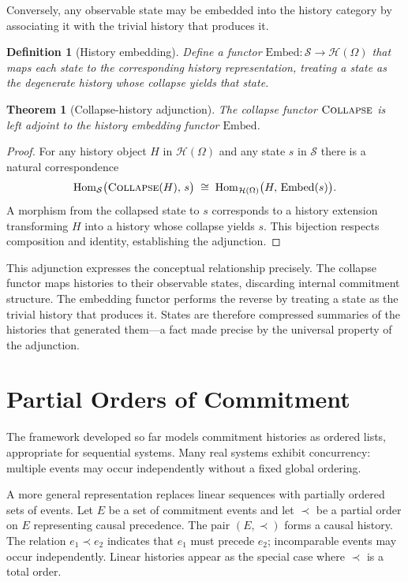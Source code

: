 \documentclass[12pt]{article}
\newtheorem{definition}{Definition}[section]
\newtheorem{theorem}{Theorem}[section]
\newcommand{\Collapse}{\operatorname{\textsc{Collapse}}}
\newcommand{\History}{\mathcal{H}}
\newcommand{\Option}{\Omega}
\newcommand{\State}{\mathcal{S}}
\begin{document}
Conversely, any observable state may be embedded into the history category by associating it with the trivial history that produces it.

\begin{definition}[History embedding]
Define a functor $\mathrm{Embed} : \State \to \History(\Option)$ that maps each state to the corresponding history representation, treating a state as the degenerate history whose collapse yields that state.
\end{definition}

\begin{theorem}[Collapse-history adjunction]
The collapse functor $\Collapse$ is left adjoint to the history embedding functor $\mathrm{Embed}$.
\end{theorem}

\begin{proof}
For any history object $H$ in $\History(\Option)$ and any state $s$ in $\State$ there is a natural correspondence
\[
\mathrm{Hom}_{\State}\bigl(\Collapse(H),\, s\bigr)
\;\cong\;
\mathrm{Hom}_{\History(\Option)}\bigl(H,\, \mathrm{Embed}(s)\bigr).
\]
A morphism from the collapsed state to $s$ corresponds to a history extension transforming $H$ into a history whose collapse yields $s$. This bijection respects composition and identity, establishing the adjunction.
\end{proof}

This adjunction expresses the conceptual relationship precisely. The collapse functor maps histories to their observable states, discarding internal commitment structure. The embedding functor performs the reverse by treating a state as the trivial history that produces it. States are therefore compressed summaries of the histories that generated them---a fact made precise by the universal property of the adjunction.

\section{Partial Orders of Commitment}
\label{sec:partialorders}

The framework developed so far models commitment histories as ordered lists, appropriate for sequential systems. Many real systems exhibit concurrency: multiple events may occur independently without a fixed global ordering.

A more general representation replaces linear sequences with partially ordered sets of events. Let $E$ be a set of commitment events and let $\prec$ be a partial order on $E$ representing causal precedence. The pair $(E,\prec)$ forms a causal history. The relation $e_1 \prec e_2$ indicates that $e_1$ must precede $e_2$; incomparable events may occur independently. Linear histories appear as the special case where $\prec$ is a total order.
\end{document}
